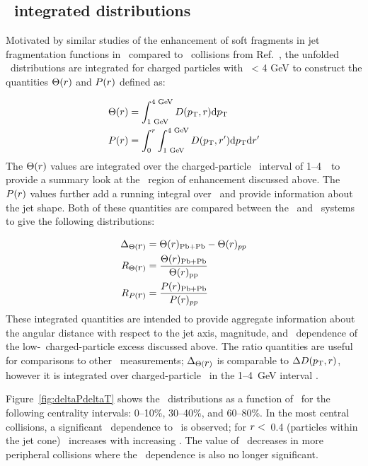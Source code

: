 \subsection{\pt\ integrated distributions}
\label{sec:discussion_int}
Motivated by similar studies of the enhancement of soft fragments in jet fragmentation functions in \pbpb\ compared to \pp\ collisions from Ref.~\cite{PhysRevC.98.024908}, the unfolded \Dptr\ distributions are integrated for charged particles with \pt\ < 4 GeV to construct the quantities $\Theta(\mbox{$r$})$ and $P(\mbox{$r$})$ defined as:

\begin{align*}
\Theta(\mbox{$r$}) &= \int_{1 \text{ GeV}}^{4 \text{ GeV}} \mbox{$D( \mbox{$p_{\mathrm{T}}$}, r)$}  \mathrm{d} \mbox{$p_{\mathrm{T}}$} \\
P(\mbox{$r$}) &= \int_0^r \int_{1 \text{ GeV}}^{4 \text{ GeV}} D(\mbox{$p_{\mathrm{T}}$}, r') \mathrm{d} \mbox{$p_{\mathrm{T}}$} \mathrm{d} r'
\end{align*}
The $\Theta(\mbox{$r$})$ values are integrated over the charged-particle \pt\ interval of 1--4~\GeV\ to provide a summary look at the \pt\ region of enhancement discussed above.
The $P(\mbox{$r$})$ values further add a running integral over \rvar\ and provide information about the jet shape.
Both of these quantities are compared between the \pp\ and \pbpb\ systems to give the following distributions:

\begin{align*}
\Delta_{\Theta(\mbox{$r$})} &= \Theta(\mbox{$r$})_{\mathrm{Pb+Pb}} - \Theta(\mbox{$r$})_{pp} \\
R_{\Theta(\mbox{$r$})} &= \frac{\Theta(\mbox{$r$})_{\mathrm{Pb+Pb}}}{\Theta(\mbox{$r$})_{\mathrm{pp}}} \\
R_{P(\mbox{$r$})} &= \frac{P(\mbox{$r$})_{\mathrm{Pb+Pb}}}{P(\mbox{$r$})_{pp}}
\end{align*}
These integrated quantities are intended to provide aggregate information about the angular distance with respect to the jet axis, magnitude, and \ptjet\ dependence of the low-\pt\ charged-particle excess discussed above.
The ratio quantities are useful for comparisons to other \pbpb\ measurements; $\Delta_{\Theta(\mbox{$r$})}$ is comparable to $\mbox{$\Delta\mbox{$D( \mbox{$p_{\mathrm{T}}$}, r)$}$}$, however it is integrated over charged-particle \pt\ in the \mbox{1--4 GeV} interval \cite{PhysRevC.98.024908}.

Figure~\ref{fig:deltaPdeltaT} shows the \DeltaTheta\ distributions as a function of \rvar\ for the following centrality intervals: 0--10\%, 30--40\%, and 60--80\%.
In the most central collisions, a significant \ptjet\ dependence to \DeltaTheta\ is observed; for $\mbox{$r$} <$~0.4 (particles within the jet cone) \DeltaTheta\ increases with increasing \ptjet.
The value of \DeltaTheta\ decreases in more peripheral collisions where the \ptjet\ dependence is also no longer significant.

